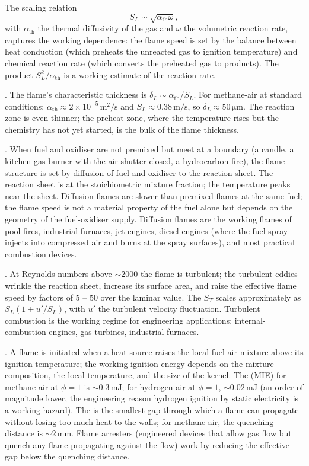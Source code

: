 The scaling relation
\[
S_L \sim \sqrt{\alpha_{\text{th}} \omega},
\]
with $\alpha_{\text{th}}$ the thermal diffusivity of the gas and
$\omega$ the volumetric reaction rate, captures the working
dependence: the flame speed is set by the balance between heat
conduction (which preheats the unreacted gas to ignition temperature)
and chemical reaction rate (which converts the preheated gas to
products). The product $S_L^2 / \alpha_{\text{th}}$ is a working
estimate of the reaction rate.

. The flame's characteristic thickness is
$\delta_L \sim \alpha_{\text{th}}/S_L$. For methane-air at standard
conditions: $\alpha_{\text{th}} \approx 2 \times 10^{-5}\,\text{m}^2/
\text{s}$ and $S_L \approx 0.38\,\text{m}/\text{s}$, so $\delta_L
\approx 50\,\si{\micro\meter}$. The reaction zone is even thinner;
the preheat zone, where the temperature rises but the chemistry has
not yet started, is the bulk of the flame thickness.

. When fuel and oxidiser are not premixed
but meet at a boundary (a candle, a kitchen-gas burner with the air
shutter closed, a hydrocarbon fire), the flame structure is set by
diffusion of fuel and oxidiser to the reaction sheet. The reaction
sheet is at the stoichiometric mixture fraction; the temperature peaks
near the sheet. Diffusion flames are slower than premixed flames at
the same fuel; the flame speed is not a material property of the fuel
alone but depends on the geometry of the fuel-oxidiser supply.
Diffusion flames are the working flames of pool fires, industrial
furnaces, jet engines, diesel engines (where the fuel spray injects
into compressed air and burns at the spray surfaces), and most
practical combustion devices.

. At Reynolds numbers above $\sim 2000$ the
flame is turbulent; the turbulent eddies wrinkle the reaction sheet,
increase its surface area, and raise the effective flame speed by
factors of $5$ -- $50$ over the laminar value. The
 $S_T$ scales approximately as $S_L
(1 + u'/S_L)$, with $u'$ the turbulent velocity fluctuation. Turbulent
combustion is the working regime for engineering applications:
internal-combustion engines, gas turbines, industrial furnaces.

. A flame is initiated when a heat
source raises the local fuel-air mixture above its ignition
temperature; the working ignition energy depends on the mixture
composition, the local temperature, and the size of the kernel. The
 (MIE) for methane-air at $\phi = 1$
is $\sim 0.3\,\text{mJ}$; for hydrogen-air at $\phi = 1$, $\sim 0.02\,
\text{mJ}$ (an order of magnitude lower, the engineering reason
hydrogen ignition by static electricity is a working hazard). The
 is the smallest gap through which a
flame can propagate without losing too much heat to the walls; for
methane-air, the quenching distance is $\sim 2\,\text{mm}$. Flame
arresters (engineered devices that allow gas flow but quench any
flame propagating against the flow) work by reducing the effective
gap below the quenching distance.

